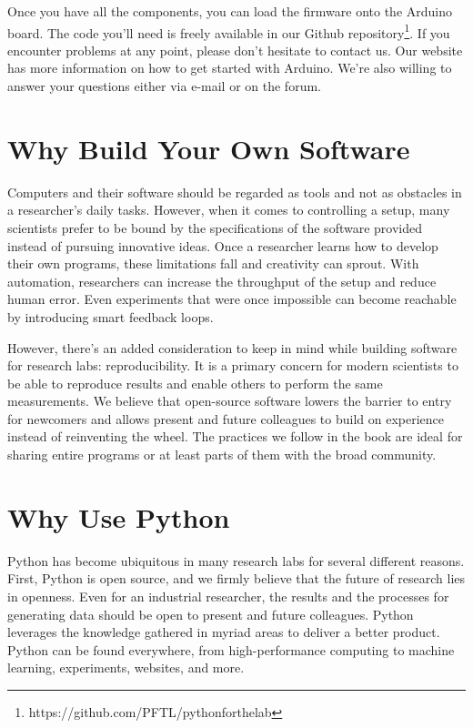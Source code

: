 Once you have all the components, you can load the firmware onto the Arduino board. The code you'll need is freely available in our Github repository\footnote{https://github.com/PFTL/pythonforthelab}. If you encounter problems at any point, please don't hesitate to contact us. Our website has more information on how to get started with Arduino. We're also willing to answer your questions either via e-mail or on the forum.

\section{Why Build Your Own Software}\label{sec:why-building-your-software}
Computers and their software should be regarded as tools and not as obstacles in a researcher's daily tasks. However, when it comes to controlling a setup, many scientists prefer to be bound by the specifications of the software provided instead of pursuing innovative ideas. Once a researcher learns how to develop their own programs, these limitations fall and creativity can sprout. With automation, researchers can increase the throughput of the setup and reduce human error. Even experiments that were once impossible can become reachable by introducing smart feedback loops.

However, there's an added consideration to keep in mind while building software for research labs: reproducibility. It is a primary concern for modern scientists to be able to reproduce results and enable others to perform the same measurements. We believe that open-source software lowers the barrier to entry for newcomers and allows present and future colleagues to build on experience instead of reinventing the wheel. The practices we follow in the book are ideal for sharing entire programs or at least parts of them with the broad community.

\section{Why Use Python}\label{sec:why-python?}
Python has become ubiquitous in many research labs for several different reasons. First, Python is open source, and we firmly believe that the future of research lies in openness. Even for an industrial researcher, the results and the processes for generating data should be open to present and future colleagues. Python leverages the knowledge gathered in myriad areas to deliver a better product. Python can be found everywhere, from high-performance computing to machine learning, experiments, websites, and more.

